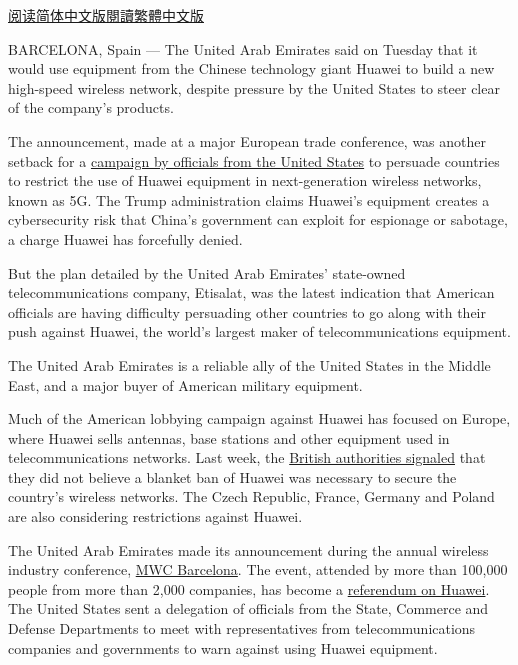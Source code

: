 \href{https://cn.nytimes.com/technology/20190227/huawei-uae-5g-network/}{阅读简体中文版}\href{https://cn.nytimes.com/technology/20190227/huawei-uae-5g-network/zh-hant/}{閱讀繁體中文版}

BARCELONA, Spain --- The United Arab Emirates said on Tuesday that it
would use equipment from the Chinese technology giant Huawei to build a
new high-speed wireless network, despite pressure by the United States
to steer clear of the company's products.

The announcement, made at a major European trade conference, was another
setback for a
\href{https://www.nytimes.com/2019/01/26/us/politics/huawei-china-us-5g-technology.html}{campaign
by officials from the United States} to persuade countries to restrict
the use of Huawei equipment in next-generation wireless networks, known
as 5G. The Trump administration claims Huawei's equipment creates a
cybersecurity risk that China's government can exploit for espionage or
sabotage, a charge Huawei has forcefully denied.

But the plan detailed by the United Arab Emirates' state-owned
telecommunications company, Etisalat, was the latest indication that
American officials are having difficulty persuading other countries to
go along with their push against Huawei, the world's largest maker of
telecommunications equipment.

The United Arab Emirates is a reliable ally of the United States in the
Middle East, and a major buyer of American military equipment.

Much of the American lobbying campaign against Huawei has focused on
Europe, where Huawei sells antennas, base stations and other equipment
used in telecommunications networks. Last week, the
\href{https://www.nytimes.com/2019/02/20/business/huawei-uk-trump.html}{British
authorities signaled} that they did not believe a blanket ban of Huawei
was necessary to secure the country's wireless networks. The Czech
Republic, France, Germany and Poland are also considering restrictions
against Huawei.

The United Arab Emirates made its announcement during the annual
wireless industry conference, \href{https://www.mwcbarcelona.com/}{MWC
Barcelona}. The event, attended by more than 100,000 people from more
than 2,000 companies, has become a
\href{https://www.nytimes.com/2019/02/22/technology/huawei-europe-mwc.html}{referendum
on Huawei}. The United States sent a delegation of officials from the
State, Commerce and Defense Departments to meet with representatives
from telecommunications companies and governments to warn against using
Huawei equipment.

